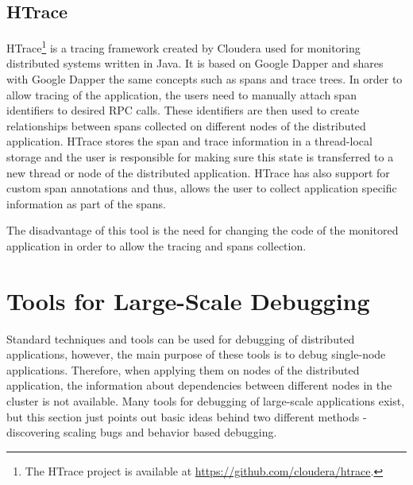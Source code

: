  \subsection{HTrace}
 \label{htrace}
 HTrace\footnote{The HTrace project is available at \url{https://github.com/cloudera/htrace}.} is a tracing framework created by Cloudera used for monitoring distributed systems written in Java. It is based on Google Dapper and shares with Google Dapper the same concepts such as spans and trace trees. In order to allow tracing of the application, the users need to manually attach span identifiers to desired RPC calls. These identifiers are then used to create relationships between spans collected on different nodes of the distributed application. HTrace stores the span and trace information in a thread-local storage and the user is responsible for making sure this state is transferred to a new thread or node of the distributed application. HTrace has also support for custom span annotations and thus, allows the user to collect application specific information as part of the spans. 
 
The disadvantage of this tool is the need for changing the code of the monitored application in order to allow the tracing and spans collection.
\section{Tools for Large-Scale Debugging}
Standard techniques and tools can be used for debugging of distributed applications, however, the main purpose of these tools is to debug single-node applications. Therefore, when applying them on nodes of the distributed application, the information about dependencies between different nodes in the cluster is not available. Many tools for debugging of large-scale applications exist, but this section just points out basic ideas behind two different methods - discovering scaling bugs and behavior based debugging. 

